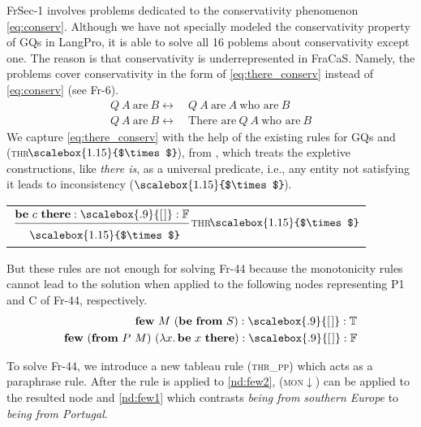 \documentclass[11pt]{article}
\makeatletter
\newcommand{\elist}{\scalebox{.9}{[\kern1pt]}}
\newcommand{\btimes}{\scalebox{1.15}{$\times$}\kern-1.5pt}
\newcommand{\rulen}[1]{{\normalfont\textsc{#1}}}
\newcommand{\addlater}[1]{\todo[line,size=\tiny]{#1}}
\newcommand{\synt}[1]{\textbf{#1}}
\newcommand{\T}{\mathbb{T}}
\newcommand{\F}{\mathbb{F}}
\newcommand{\nonBranchingRule}[3][]{
\begin{tabular}{@{}c@{}}
$\dfrac{
	\begin{tabular}{@{}r@{}}
			#2
	\end{tabular}}
{
	\raisebox{-4pt}{
		\begin{tabular}[t]{@{}r@{}}
   			#3
	\end{tabular}}
}$#1
\end{tabular}}
\makeatother
\begin{document}
 
 
FrSec-1 involves problems dedicated to the conservativity phenomenon \eqref{eq:conserv}.
Although we have not specially modeled the conservativity property of GQs in LangPro, it is able to solve all 16 poblems about conservativity except one.
The reason is that conservativity is underrepresented in FraCaS.
Namely, the problems cover conservativity in the form of \eqref{eq:there_conserv} instead of \eqref{eq:conserv} (see Fr-6).  
%
\begingroup
\setlength{\abovedisplayskip}{3mm}
\setlength{\belowdisplayskip}{3mm}
\setlength{\abovedisplayshortskip}{2mm}
\setlength{\belowdisplayshortskip}{2mm}
\begin{align}
Q~A~\text{are}~B \leftrightarrow & ~Q~A~\text{are}~A~\text{who are}~B \label{eq:conserv}
\\
Q~A~\text{are}~B \leftrightarrow & ~\text{There are}~Q~A~\text{who are}~B
\label{eq:there_conserv}
\end{align}
\endgroup
%
We capture \eqref{eq:there_conserv} with the help of the existing rules for GQs and (\rulen{thr}$\!\btimes$), from \cite{abzianidze:2015:LENLS}, which treats the expletive constructions, like {\em there is}, as a universal predicate, i.e., any entity not satisfying it leads to inconsistency ($\btimes$).  

  

\begin{center}
\nonBranchingRule[\rulen{thr}$\!\btimes$]
{$\synt{be}~c~\synt{there} : \elist : \F$}
{$\btimes$}
\end{center}

But these rules are not enough for solving Fr-44 because the monotonicity rules cannot lead to the solution when applied to the following nodes representing P1 and C of Fr-44, respectively.
%
\begingroup
\setlength{\abovedisplayskip}{3mm}
\setlength{\belowdisplayskip}{3mm}
\setlength{\abovedisplayshortskip}{2mm}
\setlength{\belowdisplayshortskip}{2mm}
\begin{align}
\synt{few}~ M~ (\synt{be}~ \synt{from}~ S) : \elist : \T
\label{nd:few1}\\
\synt{few}~ (\synt{from}~ P~ M)~ (\lambda x.\,\synt{be}~ x~ \synt{there}) : \elist : \F
\label{nd:few2}
\end{align}
\endgroup
%

To solve Fr-44, we introduce a new tableau rule (\rulen{thr\_pp}) which acts as a paraphrase rule.
After the rule is applied to \eqref{nd:few2}, (\rulen{mon}$\downarrow$) can be applied to the resulted node and \eqref{nd:few1} which contrasts {\em being from southern Europe} to {\em being from Portugal}. 
\end{document}
